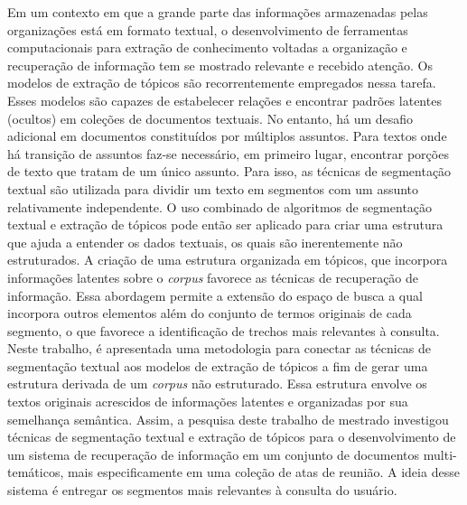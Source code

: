\setlength{\absparsep}{18pt} %
                     
\begin{resumo}

Em um contexto em que a grande parte das informações armazenadas pelas organizações está em formato textual, o desenvolvimento de ferramentas computacionais para extração de  conhecimento voltadas a organização e recuperação de informação tem se mostrado relevante e recebido atenção.
%
Os modelos de extração de tópicos são recorrentemente empregados nessa tarefa. Esses modelos são capazes de estabelecer relações e encontrar padrões latentes (ocultos) em coleções de documentos textuais.
%
No entanto, há um desafio adicional em documentos constituídos por múltiplos assuntos. Para textos onde há transição de assuntos faz-se necessário, em primeiro lugar, encontrar porções de texto que tratam de um único assunto. Para isso, as técnicas de segmentação textual são utilizada para dividir um texto em segmentos com um assunto relativamente independente.
%
%
%
%
%
O uso combinado de algoritmos de segmentação textual e extração de tópicos pode então ser aplicado para criar uma estrutura que ajuda a entender os dados textuais, os quais são inerentemente não estruturados.
% 
A criação de uma estrutura organizada em tópicos, que incorpora informações latentes sobre o \textit{corpus} favorece as técnicas de recuperação de informação. Essa abordagem permite a extensão do espaço de busca a qual incorpora outros elementos além do conjunto de termos originais de cada segmento, o que favorece a identificação de trechos mais relevantes à consulta.
% 
Neste trabalho, é apresentada uma metodologia para conectar as técnicas de segmentação textual aos modelos de extração de tópicos a fim de gerar uma estrutura derivada de um \textit{corpus} não estruturado. Essa estrutura envolve os textos originais acrescidos de informações latentes e organizadas por sua semelhança semântica.
% 
% 
% 
% 
% 
% 
Assim, a pesquisa deste trabalho de mestrado investigou técnicas de segmentação textual e extração de tópicos para o desenvolvimento de um sistema de recuperação de informação em um conjunto de documentos multi-temáticos, mais especificamente em uma coleção de atas de reunião. 
% 
A ideia desse sistema é entregar os segmentos mais relevantes à consulta do usuário. 

\end{resumo}
